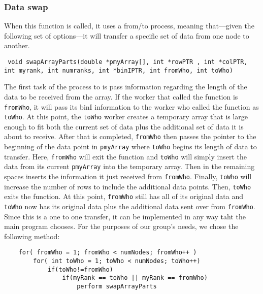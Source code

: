 \documentclass{article}
\begin{document}
\subsubsection{Data swap}
When this function is called, it uses a from/to process, meaning that---given the following set of options---it will transfer a specific set of data from one node to another. 
\begin{lstlisting}
 void swapArrayParts(double *pmyArray[], int *rowPTR , int *colPTR, int myrank, int numranks, int *binIPTR, int fromWho, int toWho)        
\end{lstlisting}
The first task of the process to is pass information regarding the length of the data to be received from the array. If the worker that called the function is \texttt{fromWho}, it will pass its binI information to the worker who called the function as \texttt{toWho}. At this point, the \texttt{toWho} worker creates a temporary array that is large enough to fit both the current set of data plus the additional set of data it is about to receive. After that is completed, \texttt{fromWho} then passes the pointer to the beginning of the data point in \texttt{pmyArray} where \texttt{toWho} begins its length of data to transfer. Here, \texttt{fromWho} will exit the function and \texttt{toWho} will simply insert the data from its current \texttt{pmyArray} into the temporary array. Then in the remaining spaces inserts the information it just received from \texttt{fromWho}. Finally, \texttt{toWho} will increase the number of rows to include the additional data points. Then, \texttt{toWho} exits the function. At this point, \texttt{fromWho} still has all of its original data and \texttt{toWho} now has its original data plus the additional data sent over from \texttt{fromWho}. Since this is a one to one transfer, it can be implemented in any way taht the main program chooses. For the purposes of our group's needs, we chose the following method:
\begin{lstlisting}
	for( fromWho = 1; fromWho < numNodes; fromWho++ )
		for( int toWho = 1; toWho < numNodes; toWho++)
			if(toWho!=fromWho)
				if(myRank == toWho || myRank == fromWho)
					perform swapArrayParts
\end{lstlisting}
\end{document}
